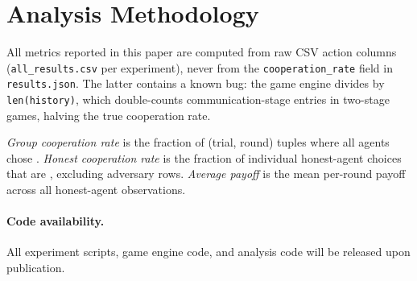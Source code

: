 \section{Analysis Methodology}\label{app:analysis}

All metrics reported in this paper are computed from raw CSV action columns (\texttt{all\_results.csv} per experiment), never from the \texttt{cooperation\_rate} field in \texttt{results.json}.
The latter contains a known bug: the game engine divides by \texttt{len(history)}, which double-counts communication-stage entries in two-stage games, halving the true cooperation rate.

\emph{Group cooperation rate} is the fraction of (trial, round) tuples where all agents chose .
\emph{Honest cooperation rate} is the fraction of individual honest-agent choices that are , excluding adversary rows.
\emph{Average payoff} is the mean per-round payoff across all honest-agent observations.

\paragraph{Code availability.}
All experiment scripts, game engine code, and analysis code will be released upon publication.
